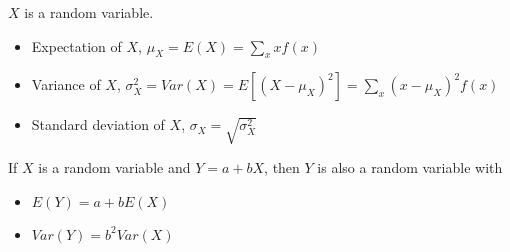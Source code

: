 \documentclass{./../../Latex/handout}
\begin{document}
\thispagestyle{plain}
\begin{center}
\end{center}	
$X$ is a random variable. \vspace{-1em}
\begin{itemize}
  \item Expectation of $X$, $\mu_X = E(X) = \sum_{x} x f(x) $
  \item Variance of $X$, $\sigma^2_X = Var(X) = E[(X-\mu_X)^2] = \sum_{x} (x-\mu_X)^2 f(x) $
  \item Standard deviation of $X$, $\sigma_X = \sqrt{\sigma_X^2}$
\end{itemize}
If $X$ is a random variable and $Y=a+bX$, then $Y$ is also a random variable with \vspace{-1em}
\begin{itemize}
\item $ E(Y) = a + b E(X)$ 
\item $Var(Y) = b^2 Var(X) $ \\~\\
\end{itemize}
\end{document}
